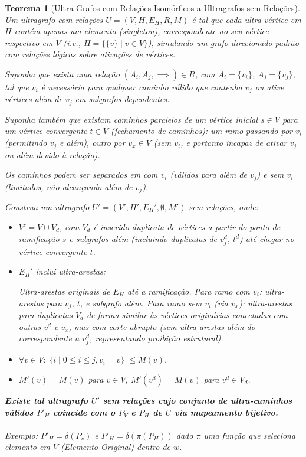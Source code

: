 \documentclass{article}
\newtheorem{theorem}{Teorema}
\begin{document}
\begin{theorem}[Ultra-Grafos com Relações Isomórficos a Ultragrafos sem Relações]
Um ultragrafo com relações \( U = (V, H, E_H, R, M) \) é tal que cada ultra-vértice em \( H \) contém apenas um elemento (singleton), correspondente ao seu vértice respectivo em \( V \) (i.e., \( H = \{ \{v\} \mid v \in V \} \)), simulando um grafo direcionado padrão com relações lógicas sobre ativações de vértices.

Suponha que exista uma relação \( (A_i, A_j, \implies) \in R \), com \( A_i = \{v_i\} \), \( A_j = \{v_j\} \), tal que \( v_i \) é necessária para qualquer caminho válido que contenha \( v_j \) ou ative vértices além de \( v_j \) em subgrafos dependentes.

Suponha também que existam caminhos paralelos de um vértice inicial \( s \in V \) para um vértice convergente \( t \in V \) (fechamento de caminhos): um ramo passando por \( v_i \) (permitindo \( v_j \) e além), outro por \( v_x \in V \) (sem \( v_i \), e portanto incapaz de ativar \( v_j \) ou além devido à relação).

Os caminhos podem ser separados em com \( v_i \) (válidos para além de \( v_j \)) e sem \( v_i \) (limitados, não alcançando além de \( v_j \)).

Construa um ultragrafo \( U' = (V', H', E_H', \emptyset, M') \) sem relações, onde:

\begin{itemize}
    \item \( V' = V \cup V_d \), com \( V_d \) é inserido duplicata de vértices a partir do ponto de ramificação \( s \) e subgrafos além (incluindo duplicatas de \( v_j^d \), \( t^d \)) até chegar no vértice convergente \( t \).
    \item \( E_H' \) inclui ultra-arestas:

    \subitem Ultra-arestas originais de \( E_H \) até a ramificação.
    \subitem Para ramo com \( v_i \): ultra-arestas para \( v_j \), \( t \), e subgrafo além.
    \subitem Para ramo sem \( v_i \) (via \( v_x \)): ultra-arestas para duplicatas \( V_d \) de forma similar às vértices originárias conectadas com outras \( v^d \) e \( v_x \), mas com corte abrupto (sem ultra-arestas além do correspondente a \( v_j^d \), representando proibição estrutural).

    \item \( \forall v \in V: |\{ i \mid 0 \leq i \leq j, v_i = v \}| \leq M(v) \).
    \item \( M'(v) = M(v) \) para \( v \in V \), \( M'(v^d) = M(v) \) para \( v^d \in V_d \).
\end{itemize}


\textbf{Existe tal ultragrafo \( U' \) sem relações cujo conjunto de ultra-caminhos válidos \( P'_H \) coincide com o \( P_V \) e \( P_H \) de \( U \) via mapeamento bijetivo.}
\\
\\
Exemplo: \( P'_H = \delta(P_v) \) e \( P'_H = \delta(\pi(P_H)) \) dado \( \pi \) uma função que seleciona elemento em \( V \) (Elemento Original) dentro de \( w \).
\end{theorem}
\end{document}
